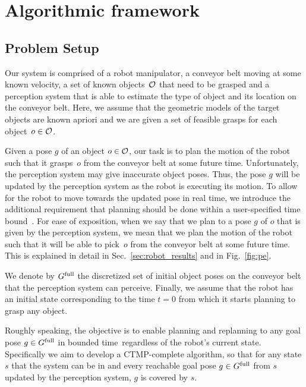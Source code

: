 \documentclass[a4paper]{report}
\begin{document}
\section{Algorithmic framework}
\subsection{Problem Setup}
Our system is comprised of 
a robot manipulator,
a conveyor belt moving at some known velocity,
a set of known objects~$\mathcal{O}$ that need to be grasped and 
a perception system that is able to estimate the type of object and its location on the conveyor belt. Here, we assume that the geometric models of the target objects are known apriori and we are given a set of feasible grasps for each object~$o \in \mathcal{O}$.

Given a pose $g$ of an object $o \in \mathcal{O}$, our task is to plan the motion of the robot such that it grasps~$o$ from the conveyor belt at some future time.
%
Unfortunately, the perception system may give inaccurate object poses.
Thus, the pose $g$ will be updated by the perception system as the robot is executing its motion. 
To allow for the robot to move towards the updated pose in real time, we introduce the additional requirement that planning should be done within a user-specified time bound~\Tbound.
%
For ease of exposition, when we say that we plan to a pose $g$ of $o$ that is given by the perception system, 
we mean that we plan the motion of the robot such that it will be able to pick~$o$ from the conveyor belt at some future time. 
This is explained in detail in Sec.~\ref{sec:robot_results} and in Fig.~\ref{fig:pe}.

%
We denote by $G^{\textrm{full}}$ the discretized set of initial object poses on the conveyor belt that the perception system can perceive.
%
Finally, we assume that the robot has an initial state \Shome corresponding to the time $t=0$ from which it starts planning to grasp any object.


Roughly speaking, the objective is to enable planning and replanning to any goal pose $ g \in G^{\textrm{full}}$ in bounded time~\Tbound regardless of the robot's current state.
%
%
%
%
Specifically we aim to develop a CTMP-complete algorithm, so that 
for any state $s$ that the system can be in 
and every reachable goal pose $g \in G^{\textrm{full}}$ from $s$ updated by the perception system,
$g$ is covered by $s$.
\end{document}
